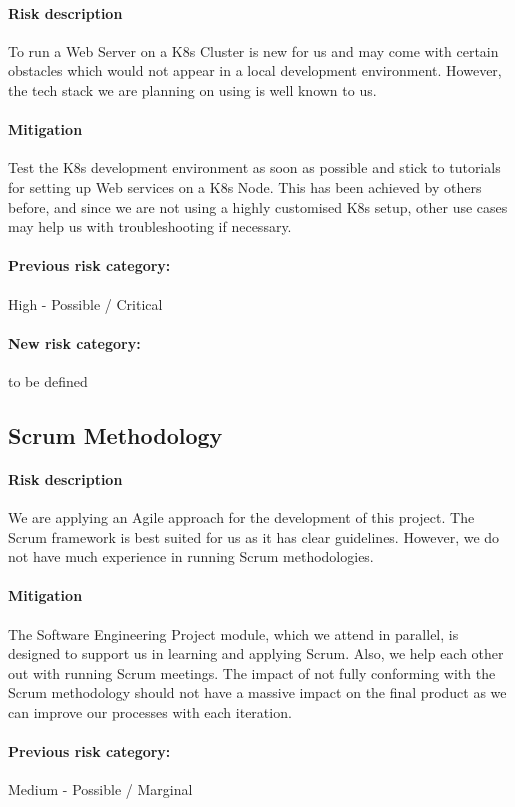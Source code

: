 \paragraph{Risk description} To run a Web Server on a K8s Cluster is new for us and may come with certain obstacles which would not appear in a local development environment. However, the tech stack we are planning on using is well known to us.
\paragraph{Mitigation} Test the K8s development environment as soon as possible and stick to tutorials for setting up Web services on a K8s Node. This has been achieved by others before, and since we are not using a highly customised K8s setup, other use cases may help us with troubleshooting if necessary.
\paragraph{Previous risk category:} High - Possible / Critical
\paragraph{New risk category:} to be defined

\subsection{Scrum Methodology}
\paragraph{Risk description} We are applying an Agile approach for the development of this project. The Scrum framework is best suited for us as it has clear guidelines. However, we do not have much experience in running Scrum methodologies. 
\paragraph{Mitigation} The Software Engineering Project module, which we attend in parallel, is designed to support us in learning and applying Scrum. Also, we help each other out with running Scrum meetings. The impact of not fully conforming with the Scrum methodology should not have a massive impact on the final product as we can improve our processes with each iteration.
\paragraph{Previous risk category:} Medium - Possible / Marginal
